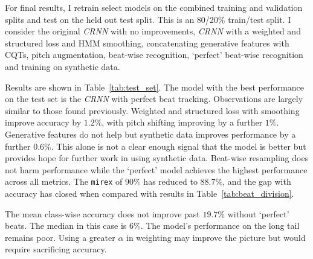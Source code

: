 For final results, I retrain select models on the combined training and validation splits and test on the held out test split. This is an 80/20\% train/test split. I consider the original \emph{CRNN} with no improvements, \emph{CRNN} with a weighted and structured loss and HMM smoothing, concatenating generative features with CQTs, pitch augmentation, beat-wise recognition, `perfect' beat-wise recognition and training on synthetic data. 

Results are shown in Table~\ref{tab:test_set}. The model with the best performance on the test set is the \emph{CRNN} with perfect beat tracking. Observations are largely similar to those found previously. Weighted and structured loss with smoothing improve accuracy by $1.2\%$, with pitch shifting improving by a further $1\%$. Generative features do not help but synthetic data improves performance by a further $0.6\%$. This alone is not a clear enough signal that the model is better but provides hope for further work in using synthetic data. Beat-wise resampling does not harm performance while the `perfect' model achieves the highest performance across all metrics. The \texttt{mirex} of $90\%$ has reduced to $88.7\%$, and the gap with accuracy has closed when compared with results in Table~\ref{tab:beat_division}. 

The mean class-wise accuracy does not improve past $19.7\%$ without `perfect' beats. The median in this case is $6\%$. The model's performance on the long tail remains poor. Using a greater $\alpha$ in weighting may improve the picture but would require sacrificing accuracy.

